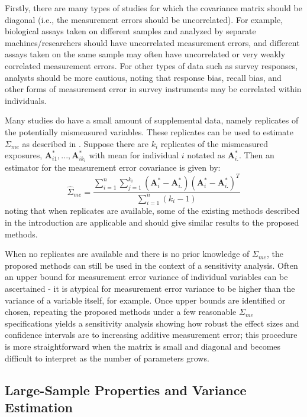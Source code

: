 \documentclass[useAMS,usenatbib,referee]{biom}
\begin{document}
Firstly, there are many types of studies for which the covariance matrix should be diagonal (i.e., the measurement errors should be uncorrelated). For example, biological assays taken on different samples and analyzed by separate machines/researchers should have uncorrelated measurement errors, and different assays taken on the same sample may often have uncorrelated or very weakly correlated measurement errors. For other types of data such as survey responses, analysts should be more cautious, noting that response bias, recall bias, and other forms of measurement error in survey instruments may be correlated within individuals.

Many studies do have a small amount of supplemental data, namely replicates of the potentially mismeasured variables. These replicates can be used to estimate $\Sigma_{me}$ as described in \citet{carroll2006}. Suppose there are $k_{i}$ replicates of the mismeasured exposures, $\bm{A}^{*}_{i1}, ..., \bm{A}^{*}_{ik_{i}}$ with mean for individual $i$ notated as $\bm{A}^{*}_{i.}$. Then an estimator for the measurement error covariance is given by:
\begin{equation*}
    \hat{\Sigma}_{me} = \frac{\sum_{i=1}^{n} \sum_{j=1}^{k_{i}} (\bm{A}^{*}_{i} - \bm{A}^{*}_{i.})(\bm{A}^{*}_{i} - \bm{A}^{*}_{i.})^{T}}{\sum_{i=1}^{n}(k_{i} - 1)}
\end{equation*}
noting that when replicates are available, some of the existing methods described in the introduction are applicable and should give similar results to the proposed methods.

When no replicates are available and there is no prior knowledge of $\Sigma_{me}$, the proposed methods can still be used in the context of a sensitivity analysis. Often an upper bound for measurement error variance of individual variables can be ascertained - it is atypical for measurement error variance to be higher than the variance of a variable itself, for example. Once upper bounds are identified or chosen, repeating the proposed methods under a few reasonable $\Sigma_{me}$ specifications yields a sensitivity analysis showing how robust the effect sizes and confidence intervals are to increasing additive measurement error; this procedure is more straightforward when the matrix is small and diagonal and becomes difficult to interpret as the number of parameters grows.

\subsection{Large-Sample Properties and Variance Estimation}
\end{document}
